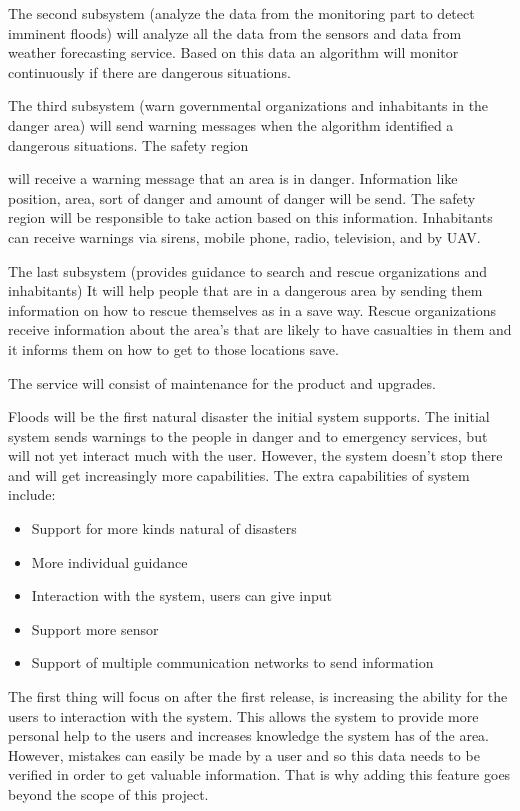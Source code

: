 The second subsystem (analyze the data from the monitoring part to detect imminent floods) will analyze all the data from the sensors and data from weather forecasting service. Based on this data an algorithm will monitor continuously if there are dangerous situations.

The third subsystem (warn governmental organizations and inhabitants in the danger area) will send warning messages when the algorithm identified a dangerous situations. The safety region will receive a warning message that an area is in danger. Information like position, area, sort of danger and amount of danger will be send. The safety region will be responsible to take action based on this information. Inhabitants can receive warnings via sirens, mobile phone, radio, television, and by UAV.

The last subsystem (provides guidance to search and rescue organizations and inhabitants) It will help people that are in a dangerous area by sending them information on how to rescue themselves as in a save way. Rescue organizations  receive information about the area's that are likely to have casualties in them and it informs them on how to get to those locations save.

The service will consist of maintenance for the product and upgrades.

Floods will be the first natural disaster the initial system supports. The initial system sends warnings to the people in danger and to emergency services, but will not yet interact much with the user. However, the system doesn't stop there and will get increasingly more capabilities. The extra capabilities of system include:
	\begin{itemize}
		\item Support for more kinds natural of disasters
		\item More individual guidance
		\item Interaction with the system, users can give input
		\item Support more sensor 
		\item Support of multiple communication networks to send information
	\end{itemize}


The first thing \CompanyName{} will focus on after the first release, is increasing the ability for the users to interaction with the system. This allows the system to provide more personal help to the users and increases knowledge the system has of the area. However, mistakes can easily be made by a user and so this data needs to be verified in order to get valuable information. That is why adding this feature goes beyond the scope of this project.

